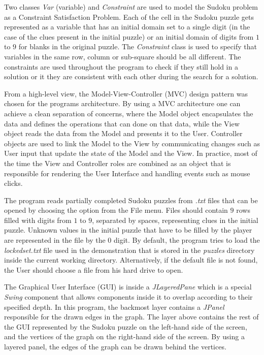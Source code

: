 \documentclass{l4proj}
\begin{document}
\noindent Two classes \textit{Var} (variable) and \textit{Constraint} are used to model the Sudoku problem as a Constraint Satisfaction Problem. Each of the cell in the Sudoku puzzle gets represented as a variable that has an initial domain set to a single digit (in the case of the clues present in the initial puzzle) or an initial domain of digits from $1$ to $9$ for blanks in the original puzzle. The \textit{Constraint} class is used to specify that variables in the same row, column or sub-square should be all different. The constraints are used throughout the program to check if they still hold in a solution or it they are consistent with each other during the search for a solution.

\noindent From a high-level view, the Model-View-Controller (MVC) design pattern was chosen for the program\textquotesingle s architecture. By using a MVC architecture one can achieve a clean separation of concerns, where the Model object encapsulates the data and defines the operations that can done on that data, while the View object reads the data from the Model and presents it to the User. Controller objects are used to link the Model to the View by communicating changes such as User input that update the state of the Model and the View. In practice, most of the time the View and Controller roles are combined as an object that is responsible for rendering the User Interface and handling events such as mouse clicks.

\noindent The program reads partially completed Sudoku puzzles from \textit{.txt} files that can be opened by choosing the option from the File menu. Files should contain $9$ rows filled with digits from $1$ to $9$, separated by spaces, representing clues in the initial puzzle. Unknown values in the initial puzzle that have to be filled by the player are represented in the file by the $0$ digit. By default, the program tries to load the \textit{lockedset.txt} file used in the demonstration that is stored in the \textit{puzzles} directory inside the current working directory. Alternatively, if the default file is not found, the User should choose a file from his hard drive to open.

\noindent The Graphical User Interface (GUI) is inside a \textit{JLayeredPane} which is a special \textit{Swing} component that allows components inside it to overlap according to their specified depth. In this program, the backmost layer contains a \textit{JPanel} responsible for the drawn edges in the graph. The layer above contains the rest of the GUI represented by the Sudoku puzzle on the left-hand side of the screen, and the vertices of the graph on the right-hand side of the screen. By using a layered panel, the edges of the graph can be drawn behind the vertices.
\end{document}
